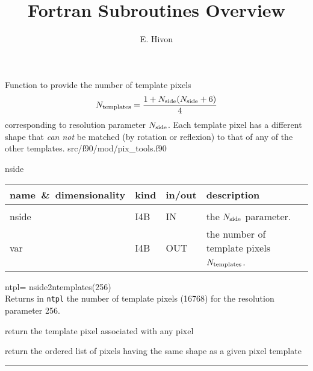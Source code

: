 
\sloppy


\title{\healpix Fortran Subroutines Overview}
 \section[nside2ntemplates]{ }
\label{sub:nside2ntemplates}
\author{E. Hivon}

\begin{facility}
{Function to provide the number of template pixels $${N_{\rm templates}}=\frac{1+{N_{\rm side}}({N_{\rm side}}+6)}{4}$$ corresponding
to resolution parameter ${N_{\rm side}}$. Each template pixel has a different shape that
{\em can not} be matched (by rotation or reflexion) to that of any of the other templates.
}
{src/f90/mod/pix\_tools.f90}
\end{facility}

\begin{f90function}
{nside}
\end{f90function}

\begin{arguments}
{
\begin{tabular}{p{0.3\hsize} p{0.05\hsize} p{0.1\hsize} p{0.45\hsize}} \hline  
\textbf{name~\&~dimensionality} & \textbf{kind} & \textbf{in/out} & \textbf{description} \\ \hline
                   &   &   &                           \\ %
nside & I4B & IN & the ${N_{\rm side}}$ parameter. \\
var & I4B & OUT & the number of template pixels ${N_{\rm templates}}$.\\
\end{tabular}
}
\end{arguments}

\begin{example}
{
ntpl= nside2ntemplates(256)  \\
}
{
Returns in {\tt ntpl} the number of \healpix template pixels (16768) for the resolution
parameter 256.
}
\end{example}
\begin{related}
  \begin{sulist}{} %
  \item[\htmlref{template\_pixel\_ring}{sub:template_pixel_xxx}]
  \item[\htmlref{template\_pixel\_nest}{sub:template_pixel_xxx}] return the
  template pixel associated with any \healpix pixel
  \item[\htmlref{same\_shape\_pixels\_ring}{sub:same_shape_pixels_xxx}] 
  \item[\htmlref{same\_shape\_pixels\_nest}{sub:same_shape_pixels_xxx}] 
  return
  the ordered list of pixels having the same shape as a given pixel template
  \end{sulist}
\end{related}

\rule{\hsize}{2mm}

